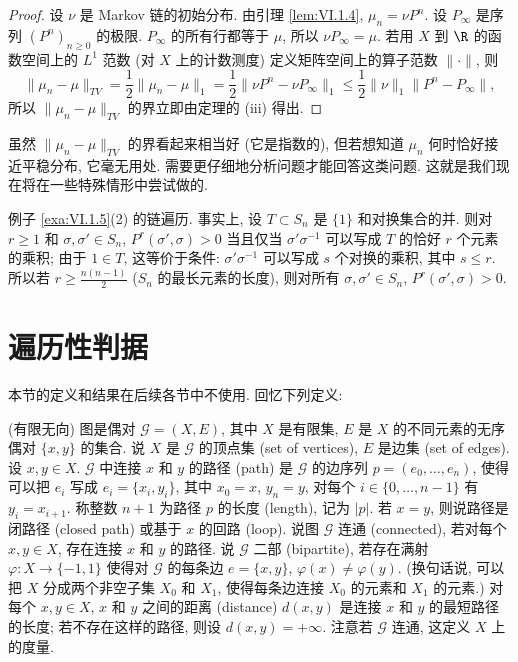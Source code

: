 \begin{proof}
设 $\nu$ 是 Markov 链的初始分布. 由引理 \ref{lem:VI.1.4}, $\mu_n = \nu P^n$. 设 $P_{\infty}$ 是序列 $(P^n)_{n \geq 0}$ 的极限. $P_{\infty}$ 的所有行都等于 $\mu$, 所以 $\nu P_{\infty} = \mu$. 若用 $X$ 到 $\R$ 的函数空间上的 $L^1$ 范数 (对 $X$ 上的计数测度) 定义矩阵空间上的算子范数 $\|\cdot\|$, 则
\[
\|\mu_n - \mu\|_{TV} = \frac{1}{2}\|\mu_n - \mu\|_1 = \frac{1}{2}\|\nu P^n - \nu P_{\infty}\|_1 \leq \frac{1}{2}\|\nu\|_1\|P^n - P_{\infty}\|,
\]
所以 $\|\mu_n - \mu\|_{TV}$ 的界立即由定理的 (iii) 得出.
\end{proof}

\begin{remark}[收敛界的缺陷]
\label{rem:VI.2.8}
虽然 $\|\mu_n - \mu\|_{TV}$ 的界看起来相当好 (它是指数的), 但若想知道 $\mu_n$ 何时恰好接近平稳分布, 它毫无用处. 需要更仔细地分析问题才能回答这类问题. 这就是我们现在将在一些特殊情形中尝试做的.
\end{remark}

\begin{example}[随机对换链遍历]
\label{exa:VI.2.9}
例子 \ref{exa:VI.1.5}(2) 的链遍历. 事实上, 设 $T \subset S_n$ 是 $\{1\}$ 和对换集合的并. 则对 $r \geq 1$ 和 $\sigma, \sigma' \in S_n$, $P^r(\sigma', \sigma) > 0$ 当且仅当 $\sigma'\sigma^{-1}$ 可以写成 $T$ 的恰好 $r$ 个元素的乘积; 由于 $1 \in T$, 这等价于条件: $\sigma'\sigma^{-1}$ 可以写成 $s$ 个对换的乘积, 其中 $s \leq r$. 所以若 $r \geq \frac{n(n-1)}{2}$ ($S_n$ 的最长元素的长度), 则对所有 $\sigma, \sigma' \in S_n$, $P^r(\sigma', \sigma) > 0$.
\end{example}

\section{遍历性判据}
本节的定义和结果在后续各节中不使用.
回忆下列定义:

\begin{definition}[图 (graph)]
\label{def:VI.3.1}
(有限无向) 图是偶对 $\mathcal{G} = (X, E)$, 其中 $X$ 是有限集, $E$ 是 $X$ 的不同元素的无序偶对 $\{x, y\}$ 的集合. 说 $X$ 是 $\mathcal{G}$ 的顶点集 (set of vertices), $E$ 是边集 (set of edges).
设 $x, y \in X$. $\mathcal{G}$ 中连接 $x$ 和 $y$ 的路径 (path) 是 $\mathcal{G}$ 的边序列 $p = (e_0, \ldots, e_n)$, 使得可以把 $e_i$ 写成 $e_i = \{x_i, y_i\}$, 其中 $x_0 = x$, $y_n = y$, 对每个 $i \in \{0, \ldots, n-1\}$ 有 $y_i = x_{i+1}$. 称整数 $n + 1$ 为路径 $p$ 的长度 (length), 记为 $|p|$. 若 $x = y$, 则说路径是闭路径 (closed path) 或基于 $x$ 的回路 (loop).
说图 $\mathcal{G}$ 连通 (connected), 若对每个 $x, y \in X$, 存在连接 $x$ 和 $y$ 的路径. 说 $\mathcal{G}$ 二部 (bipartite), 若存在满射 $\varphi \colon X \to \{-1, 1\}$ 使得对 $\mathcal{G}$ 的每条边 $e = \{x, y\}$, $\varphi(x) \neq \varphi(y)$. (换句话说, 可以把 $X$ 分成两个非空子集 $X_0$ 和 $X_1$, 使得每条边连接 $X_0$ 的元素和 $X_1$ 的元素.)
对每个 $x, y \in X$, $x$ 和 $y$ 之间的距离 (distance) $d(x, y)$ 是连接 $x$ 和 $y$ 的最短路径的长度; 若不存在这样的路径, 则设 $d(x, y) = +\infty$. 注意若 $\mathcal{G}$ 连通, 这定义 $X$ 上的度量.
\end{definition}

